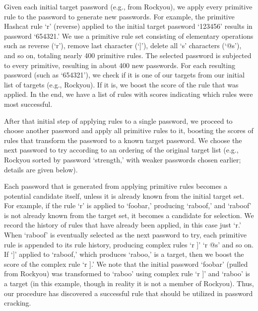 \documentclass[letterpaper,twocolumn,10pt]{article}
\begin{document}
Given each initial target password (e.g., from Rockyou), we apply every
primitive rule to the password to generate new passwords. For example, the
primitive Hashcat rule `r' (reverse) applied to the initial target password
`123456' results in password `654321.' We use a primitive rule set consisting of
elementary operations such as reverse (`r'), remove last character (`]'), delete
all `s' characters (`@s'), and so on, totaling nearly 400 primitive rules. The
selected password is subjected to every primitive, resulting in about 400 new
passwords. For each resulting password (such as `654321'), we check if it is one
of our targets from our initial list of targets (e.g., Rockyou). If it is, we
boost the score of the rule that was applied. In the end, we have a list of
rules with scores indicating which rules were most successful.

After that initial step of applying rules to a single password, we proceed to
choose another password and apply all primitive rules to it, boosting the scores
of rules that transform the password to a known target password. We choose the
next password to try according to an ordering of the original target list (e.g.,
Rockyou sorted by password `strength,' with weaker passwords chosen earlier;
details are given below).

Each password that is generated from applying primitive rules becomes a
potential candidate itself, unless it is already known from the initial target
set. For example, if the rule `r' is applied to `foobar,' producing `raboof,'
and `raboof' is not already known from the target set, it becomes a candidate
for selection. We record the history of rules that have already been applied, in
this case just `r.' When `raboof' is eventually selected as the next password to
try, each primitive rule is appended to its rule history, producing complex
rules `r ]' `r @s' and so on. If `]' applied to `raboof,' which produces
`raboo,' is a target, then we boost the score of the complex rule `r ].' We note
that the initial password `foobar' (pulled from Rockyou) was transformed to
`raboo' using complex rule `r ]' and `raboo' is a target (in this example,
though in reality it is not a member of Rockyou). Thus, our procedure has
discovered a successful rule that should be utilized in password cracking.
\end{document}
